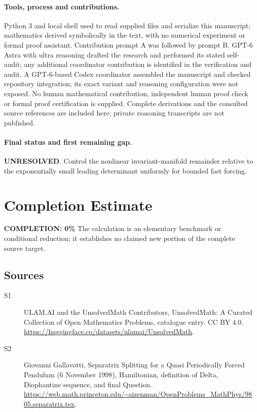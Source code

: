 \documentclass[11pt]{article}
\begin{document}
\paragraph{Tools, process and contributions.}
Python 3 and local shell used to read supplied files and serialize this manuscript; mathematics derived symbolically in the text, with no numerical experiment or formal proof assistant. Contribution prompt A was followed by prompt B. GPT-6 Astra with ultra reasoning drafted the research and performed its stated self-audit; any additional coordinator contribution is identified in the verification and audit. A GPT-6-based Codex coordinator assembled the manuscript and checked repository integration; its exact variant and reasoning configuration were not exposed. No human mathematical contribution, independent human proof check or formal proof certification is supplied. Complete derivations and the consulted source references are included here; private reasoning transcripts are not published.

\paragraph{Final status and first remaining gap.}
\textbf{UNRESOLVED}. Control the nonlinear invariant-manifold remainder relative to the exponentially small leading determinant uniformly for bounded fast forcing.

\section{Completion Estimate}
\noindent\textbf{COMPLETION: 0\%}
The calculation is an elementary benchmark or conditional reduction; it establishes no claimed new portion of the complete source target.

\subsection{Sources}
\begin{description}
\item[\hypertarget{source:statement:1}{S1}] ULAM.AI and the UnsolvedMath Contributors, UnsolvedMath: A Curated Collection of Open Mathematics Problems, catalogue entry. CC BY 4.0. \url{https://huggingface.co/datasets/ulamai/UnsolvedMath}.
\item[\hypertarget{source:statement:2}{S2}] Giovanni Gallavotti, Separatrix Splitting for a Quasi Periodically Forced Pendulum (6 November 1998), Hamiltonian, definition of Delta, Diophantine sequence, and final Question. \url{https://web.math.princeton.edu/~aizenman/OpenProblems_MathPhys/9805.separatrix.tex}.
\end{description}
\label{end:statement}
\end{document}
